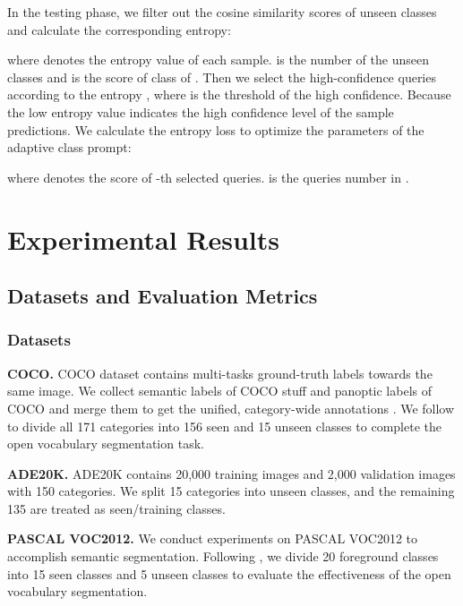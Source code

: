 \documentclass[10pt,twocolumn,letterpaper]{article}
\begin{document}
In the testing phase, we filter out the cosine similarity scores  of unseen classes and calculate the corresponding entropy:

where  denotes the entropy value of each sample.  is the number of the unseen classes and  is the score of  class of . Then we select the high-confidence queries according to the entropy , where  is the threshold of the high confidence. Because the low entropy value indicates the high confidence level of the sample predictions. We calculate the entropy loss  to optimize the parameters of the adaptive class prompt:

where  denotes the score of -th  selected queries.  is the queries number in .


\section{Experimental Results}


\subsection{Datasets and Evaluation Metrics}

\subsubsection{Datasets}

\textbf{COCO.} COCO dataset \cite{lin2014microsoft} contains multi-tasks ground-truth labels towards the same image. We collect semantic labels of COCO stuff\cite{caesar2018coco} and panoptic labels of COCO and merge them to get the unified, category-wide annotations . 
We follow \cite{xian2019semantic, xu2021simple} to divide all 171 categories into 156 seen and 15 unseen classes to complete the open vocabulary segmentation task. 

\noindent \textbf{ADE20K.} ADE20K \cite{zhou2017scene} contains 20,000 training images and 2,000 validation images with 150 categories. We split 15 categories into unseen classes, and the remaining 135 are treated as seen/training classes.

\noindent \textbf{PASCAL VOC2012.} We conduct experiments on PASCAL VOC2012\cite{everingham2012pascal} to accomplish semantic segmentation.
Following \cite{xian2019semantic, xu2021simple}, we divide 20 foreground classes into 15 seen classes and 5 unseen classes to evaluate the effectiveness of the open vocabulary segmentation.
\end{document}
